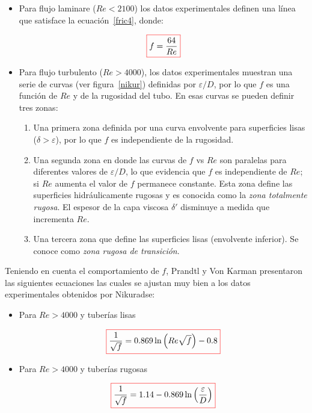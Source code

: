 \documentclass[11pt, oneside]{article}
\begin{document}
\begin{itemize}
\item Para flujo laminare ($Re<2100$) los datos experimentales definen una l\'inea que satisface la ecuaci\'on~\ref{fric4}, donde: 

\begin{equation}
\color{red}\boxed{\color{black} f = \frac{64}{Re} }
\label{fric6}
\end{equation}

\item Para flujo turbulento ($Re > 4000$), los datos experimentales muestran una serie de curvas (ver figura~\ref{nikur}) definidas por $\varepsilon/D$, por lo que $f$ es una funci\'on de $Re$ y de la rugosidad del tubo. En esas curvas se pueden definir tres zonas:

\begin{enumerate}
\item Una primera zona definida por una curva envolvente para superficies lisas ($\delta > \varepsilon$), por lo que $f$ es independiente de la rugosidad.
\item Una segunda zona en donde las curvas de $f$ vs $Re$ son paralelas para diferentes valores de $\varepsilon/D$, lo que evidencia que $f$ es independiente de $Re$; si $Re$ aumenta el valor de $f$ permanece constante. Esta zona define las superficies hidr\'aulicamente rugosas y es conocida como la \emph{zona totalmente rugosa}. El espesor de la capa viscosa $\delta '$ disminuye a medida que incrementa $Re$.
\item Una tercera zona que define las superficies lisas (envolvente inferior). Se conoce como \emph{zona rugosa de transici\'on}. 
\end{enumerate}
\end{itemize}
  
Teniendo en cuenta el comportamiento de $f$, Prandtl y Von Karman presentaron las siguientes ecuaciones las cuales se ajustan muy bien a los datos experimentales obtenidos por Nikuradse:
\begin{itemize}
\item Para $Re > 4000$ y tuber\'ias lisas

\begin{equation}
\color{red}\boxed{\color{black} \frac{1}{\sqrt{f}} = 0.869 \ln \left( Re \sqrt{f} \right ) - 0.8 }
\label{fric7}
\end{equation}

\item Para $Re > 4000$ y tuber\'ias rugosas 

\begin{equation}
\color{red}\boxed{\color{black} \frac{1}{\sqrt{f}} = 1.14 - 0.869 \ln \left( \frac{\varepsilon}{D} \right ) }
\label{fric8}
\end{equation}

\end{itemize}
\end{document}

